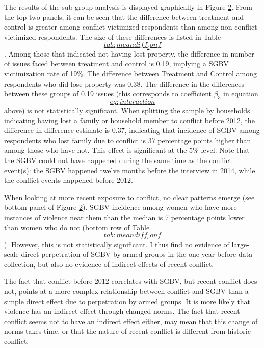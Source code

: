 \documentclass[
]{article}
\begin{document}
The results of the sub-group analysis is displayed graphically in Figure
\hyperref[fig:meancompare_conf]{2}. From the top two panels, it can be
seen that the difference between treatment and control is greater among
conflict-victimized respondents than among non-conflict victimized
respondents. The size of these differences is listed in Table
\hyperref[tab:meandiff_conf]{\[tab:meandiff_conf\]}. Among those that
indicated not having lost property, the difference in number of issues
faced between treatment and control is 0.19, implying a SGBV
victimization rate of 19\%. The difference between Treatment and Control
among respondents who did lose property was 0.38. The difference in the
differences between these groups of 0.19 issues (this corresponds to
coefficient \(\beta_3\) in equation
\hyperref[eq:interaction]{\[eq:interaction\]} above) is not
statistically significant. When splitting the sample by households
indicating having lost a family or household member to conflict before
2012, the difference-in-difference estimate is 0.37, indicating that
incidence of SGBV among respondents who lost family due to conflict is
37 percentage points higher than among those who have not. This effect
is significant at the 5\% level. Note that the SGBV could not have
happened during the same time as the conflict event(s): the SGBV
happened twelve months before the interview in 2014, while the conflict
events happened before 2012.

When looking at more recent exposure to conflict, no clear patterns
emerge (see bottom panel of Figure \hyperref[fig:meancompare_conf]{2}).
SGBV incidence among women who have more instances of violence near them
than the median is 7 percentage points lower than women who do not
(bottom row of Table
\hyperref[tab:meandiff_conf]{\[tab:meandiff_conf\]}). However, this is
not statistically significant. I thus find no evidence of large-scale
direct perpetration of SGBV by armed groups in the one year before data
collection, but also no evidence of indirect effects of recent conflict.

The fact that conflict before 2012 correlates with SGBV, but recent
conflict does not, points at a more complex relationship between
conflict and SGBV than a simple direct effect due to perpetration by
armed groups. It is more likely that violence has an indirect effect
through changed norms. The fact that recent conflict seems not to have
an indirect effect either, may mean that this change of norms takes
time, or that the nature of recent conflict is different from historic
conflict.
\end{document}
